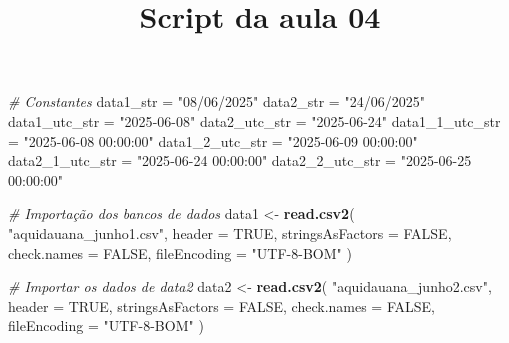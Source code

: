\documentclass[
]{article}
\title{Script da aula 04}
\author{}
\date{\vspace{-2.5em}}
\newenvironment{Shaded}{\begin{snugshade}}{\end{snugshade}}
\newcommand{\AttributeTok}[1]{\textcolor[rgb]{0.13,0.29,0.53}{#1}}
\newcommand{\CommentTok}[1]{\textcolor[rgb]{0.56,0.35,0.01}{\textit{#1}}}
\newcommand{\ConstantTok}[1]{\textcolor[rgb]{0.56,0.35,0.01}{#1}}
\newcommand{\FunctionTok}[1]{\textcolor[rgb]{0.13,0.29,0.53}{\textbf{#1}}}
\newcommand{\NormalTok}[1]{#1}
\newcommand{\OtherTok}[1]{\textcolor[rgb]{0.56,0.35,0.01}{#1}}
\newcommand{\StringTok}[1]{\textcolor[rgb]{0.31,0.60,0.02}{#1}}
\begin{document}
\maketitle

\begin{Shaded}
\begin{Highlighting}[]
\CommentTok{\# Constantes}
\NormalTok{data1\_str }\OtherTok{=} \StringTok{"08/06/2025"}
\NormalTok{data2\_str }\OtherTok{=} \StringTok{"24/06/2025"}
\NormalTok{data1\_utc\_str }\OtherTok{=} \StringTok{"2025{-}06{-}08"}
\NormalTok{data2\_utc\_str }\OtherTok{=} \StringTok{"2025{-}06{-}24"}
\NormalTok{data1\_1\_utc\_str }\OtherTok{=} \StringTok{"2025{-}06{-}08 00:00:00"}
\NormalTok{data1\_2\_utc\_str }\OtherTok{=} \StringTok{"2025{-}06{-}09 00:00:00"}
\NormalTok{data2\_1\_utc\_str }\OtherTok{=} \StringTok{"2025{-}06{-}24 00:00:00"}
\NormalTok{data2\_2\_utc\_str }\OtherTok{=} \StringTok{"2025{-}06{-}25 00:00:00"}
\end{Highlighting}
\end{Shaded}

\begin{Shaded}
\begin{Highlighting}[]
\CommentTok{\# Importação dos bancos de dados}
\NormalTok{data1 }\OtherTok{\textless{}{-}} \FunctionTok{read.csv2}\NormalTok{(}
  \StringTok{"aquidauana\_junho1.csv"}\NormalTok{,}
  \AttributeTok{header =} \ConstantTok{TRUE}\NormalTok{,}
  \AttributeTok{stringsAsFactors =} \ConstantTok{FALSE}\NormalTok{,}
  \AttributeTok{check.names =} \ConstantTok{FALSE}\NormalTok{,}
  \AttributeTok{fileEncoding =} \StringTok{"UTF{-}8{-}BOM"}
\NormalTok{)}

\CommentTok{\# Importar os dados de data2}
\NormalTok{data2 }\OtherTok{\textless{}{-}} \FunctionTok{read.csv2}\NormalTok{(}
  \StringTok{"aquidauana\_junho2.csv"}\NormalTok{,}
  \AttributeTok{header =} \ConstantTok{TRUE}\NormalTok{,}
  \AttributeTok{stringsAsFactors =} \ConstantTok{FALSE}\NormalTok{,}
  \AttributeTok{check.names =} \ConstantTok{FALSE}\NormalTok{,}
  \AttributeTok{fileEncoding =} \StringTok{"UTF{-}8{-}BOM"}
\NormalTok{)}
\end{Highlighting}
\end{Shaded}
\end{document}
